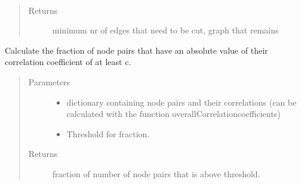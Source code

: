 \documentclass[letterpaper,10pt,english]{sphinxmanual}
\begin{document}

\begin{fulllineitems}
\label{\detokenize{clustering:clustering.kargerMinCut}}~\begin{quote}\begin{description}
\item[{Returns}] \leavevmode
\sphinxAtStartPar
minimum nr of edges that need to be cut, graph that remains

\end{description}\end{quote}

\end{fulllineitems}


\begin{fulllineitems}
\label{\detokenize{clustering:clustering.nodepairFraction}}
\sphinxAtStartPar
Calculate the fraction of node pairs that have an absolute value of their correlation coefficient of at least c.
\begin{quote}\begin{description}
\item[{Parameters}] \leavevmode\begin{itemize}
\item {} 
\sphinxAtStartPar
{} \textendash{} dictionary containing node pairs and their correlations (can be calculated with the function overallCorrelationcoefficients)

\item {} 
\sphinxAtStartPar
{} \textendash{} Threshold for fraction.

\end{itemize}

\item[{Returns}] \leavevmode
\sphinxAtStartPar
fraction of number of node pairs that is above threshold.

\end{description}\end{quote}

\end{fulllineitems}
\end{document}
